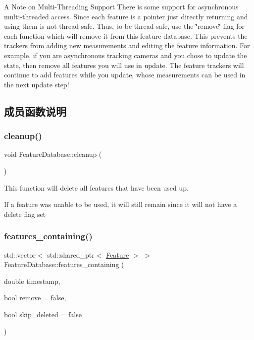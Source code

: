 \begin{DoxyParagraph}{A Note on Multi-\/\+Threading Support}
There is some support for asynchronous multi-\/threaded access. Since each feature is a pointer just directly returning and using them is not thread safe. Thus, to be thread safe, use the \char`\"{}remove\char`\"{} flag for each function which will remove it from this feature database. This prevents the trackers from adding new measurements and editing the feature information. For example, if you are asynchronous tracking cameras and you chose to update the state, then remove all features you will use in update. The feature trackers will continue to add features while you update, whose measurements can be used in the next update step! 
\end{DoxyParagraph}


\subsection{成员函数说明}
\mbox{\label{classov__core_1_1FeatureDatabase_abee9d8a5fa7fc4a97911058b6e8d10a0}} 
\subsubsection{\texorpdfstring{cleanup()}{cleanup()}}
{\footnotesize\ttfamily void Feature\+Database\+::cleanup (\begin{DoxyParamCaption}{ }\end{DoxyParamCaption})}



This function will delete all features that have been used up. 

If a feature was unable to be used, it will still remain since it will not have a delete flag set \mbox{\label{classov__core_1_1FeatureDatabase_a144b59272688f0aeea0ecec6028dca04}} 
\subsubsection{\texorpdfstring{features\+\_\+containing()}{features\_containing()}}
{\footnotesize\ttfamily std\+::vector$<$ std\+::shared\+\_\+ptr$<$ \hyperlink{classov__core_1_1Feature}{Feature} $>$ $>$ Feature\+Database\+::features\+\_\+containing (\begin{DoxyParamCaption}\item[{double}]{timestamp,  }\item[{bool}]{remove = {\ttfamily false},  }\item[{bool}]{skip\+\_\+deleted = {\ttfamily false} }\end{DoxyParamCaption})}



